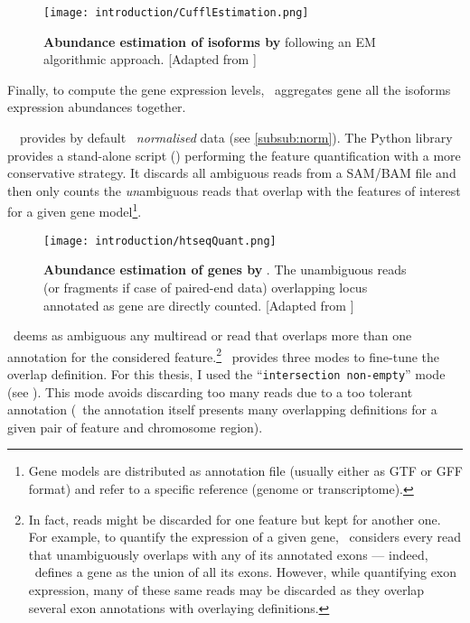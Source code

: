 \begin{figure}
    \texttt{[image: introduction/CufflEstimation.png]}\centering
    \caption[Abundance estimation of isoforms by
    Cufflinks]{\label{fig:cuffEstimation}\textbf{Abundance estimation of isoforms
    by \cuffl} following an \gls{EM} algorithmic approach. [Adapted from
    \cite{Turner2015}]}
\end{figure}

Finally, to compute the gene expression levels, \cuffl\ aggregates 
gene all the isoforms expression abundances together.

\NB\ \cuffl\ provides by default \FPKM\ \emph{normalised} data (see
\cref{subsub:norm}).
The \gls{Python} library  provides a stand-alone script
(\htseq) performing the feature quantification with a more conservative strategy.
It discards all ambiguous reads from a \gls{SAM}/\gls{BAM} file and then
only counts the \emph{un}ambiguous reads that overlap with the features of
interest for a given gene model\footnote{Gene models are distributed as
annotation file (usually either as \gls{GTF} or \gls{GFF} format) and refer
to a specific reference (genome or transcriptome).}.

\begin{figure}
    \texttt{[image: introduction/htseqQuant.png]}\centering
    \caption[Abundance estimation of genes by
    HTSeq-count]{\label{fig:htseqEstimation}\textbf{Abundance estimation of genes
    by \htseq}. The unambiguous reads (or fragments if case of paired-end data)
    overlapping locus annotated as gene are directly counted. [Adapted from
    \cite{MarPhD}]}
  \end{figure}

\htseq\ deems as ambiguous any multiread or read that overlaps more than
one annotation for the considered feature.\footnote{In fact, reads might be
discarded for one feature but kept for another one. For example, to quantify the
expression of a given gene, \htseq\ considers every read that unambiguously
overlaps with any of its annotated exons --- indeed, \htseq\ defines a gene
as the union of all its exons. However, while quantifying exon expression, many
of these same reads may be discarded as they overlap several exon annotations
with overlaying definitions.}
\htseq\ provides
three modes to fine-tune the overlap definition.
For this thesis, I used the \enquote{\texttt{intersection non-empty}} mode
(see ).
This mode avoids discarding too many reads due to a too tolerant annotation
(\ie\ the annotation itself presents many overlapping definitions for a given
pair of feature and chromosome region).

